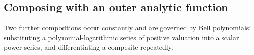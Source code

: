 \documentclass[11pt,oneside]{article}
\theoremstyle{plain}
\theoremstyle{definition}
\theoremstyle{remark}
\begin{document}
\subsection{Composing with an outer analytic function}
\label{plt:sec:tay-faa-di-bruno}

Two further compositions occur constantly and are governed by Bell
polynomials: substituting a polynomial-logarithmic series of positive
valuation into a scalar power series, and differentiating a composite
repeatedly.

\end{document}
